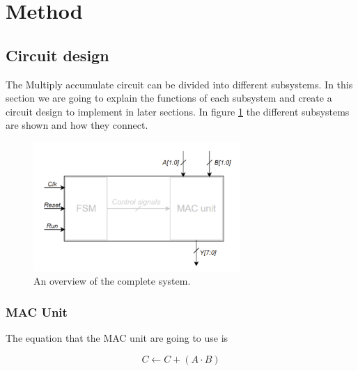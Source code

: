 \section{Method}
\label{sec:method}

\subsection{Circuit design}
The Multiply accumulate circuit can be divided into different subsystems. In this section we are going to explain the functions of each subsystem and create a circuit design to implement in later sections. In figure \ref{fig:blokk} the different subsystems are shown and how they connect. 

\begin{figure}[H]
    \centering
    \includegraphics[width=0.7\textwidth]{Figures/Blokk.png}
    \caption{An overview of the complete system.}
    \label{fig:blokk}
\end{figure}

\subsubsection{MAC Unit}
The equation that the MAC unit are going to use is

\begin{equation}
    C \leftarrow C + (A \cdot B)
\end{equation}

